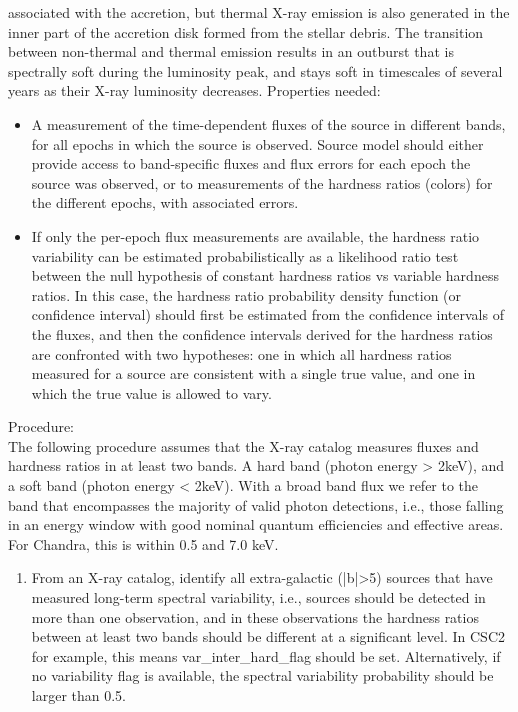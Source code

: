 \begin{enumerate}
  associated with the accretion, but thermal X-ray emission is also generated in
  the inner part of the accretion disk formed from the stellar debris. The
  transition between non-thermal and thermal emission results in an outburst
  that is spectrally soft during the luminosity peak, and stays soft in
  timescales of several years as their X-ray luminosity decreases.
  Properties needed:
  \begin{itemize}
  \item A measurement of the time-dependent fluxes of the source in different bands, for all epochs in which the source is observed. Source model should either provide access to band-specific fluxes and flux errors for each epoch the source was observed, or to measurements of the hardness ratios (colors) for the different epochs, with associated errors.
  \item If only the per-epoch flux measurements are available, the hardness ratio variability can be estimated probabilistically as a likelihood ratio test between the null hypothesis of constant hardness ratios vs variable hardness ratios. In this case, the hardness ratio probability density function (or confidence interval) should first be estimated from the confidence intervals of the fluxes, and then the confidence intervals derived for the hardness ratios are confronted with two hypotheses: one in which all hardness ratios measured for a source are consistent with a single true value, and one in which the true value is allowed to vary.
  \end{itemize}
  Procedure: \\
  The following procedure assumes that the X-ray catalog measures fluxes and hardness ratios in at least two bands. A hard band (photon energy > 2keV), and a soft band (photon energy < 2keV). With a broad band flux we refer to the band that encompasses the majority of valid photon detections, i.e., those falling in an energy window with good nominal quantum efficiencies and effective areas. For Chandra, this is within 0.5 and 7.0 keV.
  \begin{enumerate}
  \item From an X-ray catalog, identify all extra-galactic (|b|>5) sources that have measured long-term spectral variability, i.e., sources should be detected in more than one observation, and in these observations the hardness ratios between at least two bands should be different at a significant level. In CSC2 for example, this means var\_inter\_hard\_flag should be set. Alternatively, if no variability flag is available, the spectral variability probability should be larger than 0.5.

\end{enumerate}
\end{enumerate}
